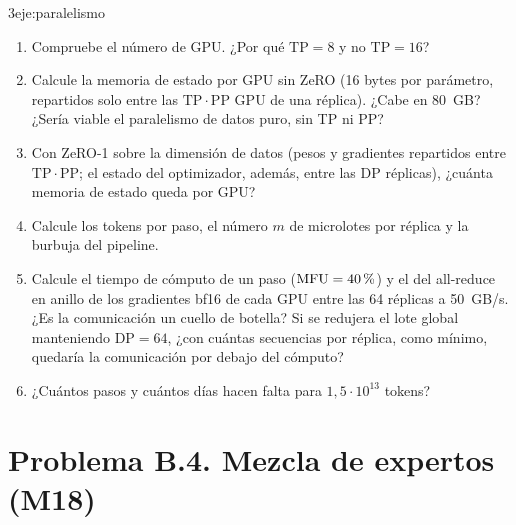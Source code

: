 \begin{ejercicio}{3}{eje:paralelismo}
\begin{enumerate}[label=(\alph*)]
  \item {} Compruebe el número de GPU. ¿Por qué $\mathrm{TP}=8$ y no $\mathrm{TP}=16$?
  \item {} Calcule la memoria de estado por GPU sin ZeRO (16 bytes por parámetro, repartidos solo entre las $\mathrm{TP}\cdot\mathrm{PP}$ GPU de una réplica). ¿Cabe en 80~GB? ¿Sería viable el paralelismo de datos puro, sin TP ni PP?
  \item {} Con ZeRO-1 sobre la dimensión de datos (pesos y gradientes repartidos entre $\mathrm{TP}\cdot\mathrm{PP}$; el estado del optimizador, además, entre las $\mathrm{DP}$ réplicas), ¿cuánta memoria de estado queda por GPU?
  \item {} Calcule los tokens por paso, el número $m$ de microlotes por réplica y la burbuja del pipeline.
  \item {} Calcule el tiempo de cómputo de un paso ($\mathrm{MFU}=40\,\%$) y el del all-reduce en anillo de los gradientes bf16 de cada GPU entre las 64 réplicas a 50~GB/s. ¿Es la comunicación un cuello de botella? Si se redujera el lote global manteniendo $\mathrm{DP}=64$, ¿con cuántas secuencias por réplica, como mínimo, quedaría la comunicación por debajo del cómputo?
  \item {} ¿Cuántos pasos y cuántos días hacen falta para $1{,}5\cdot 10^{13}$ tokens?
\end{enumerate}
\end{ejercicio}

\section*{Problema B.4. Mezcla de expertos (M18)}

